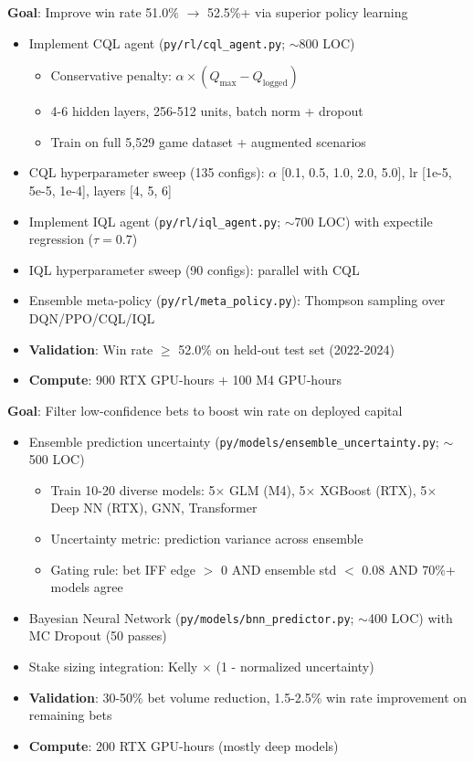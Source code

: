 \textbf{Goal}: Improve win rate 51.0\% $\to$ 52.5\%+ via superior policy learning

\begin{itemize}
  \item {} Implement CQL agent (\texttt{py/rl/cql\_agent.py}; $\sim$800 LOC)
  \begin{itemize}
    \item Conservative penalty: $\alpha \times (Q_{\max} - Q_{\text{logged}})$
    \item 4-6 hidden layers, 256-512 units, batch norm + dropout
    \item Train on full 5,529 game dataset + augmented scenarios
  \end{itemize}
  \item {} CQL hyperparameter sweep (135 configs): $\alpha$ [0.1, 0.5, 1.0, 2.0, 5.0], lr [1e-5, 5e-5, 1e-4], layers [4, 5, 6]
  \item {} Implement IQL agent (\texttt{py/rl/iql\_agent.py}; $\sim$700 LOC) with expectile regression ($\tau=0.7$)
  \item {} IQL hyperparameter sweep (90 configs): parallel with CQL
  \item {} Ensemble meta-policy (\texttt{py/rl/meta\_policy.py}): Thompson sampling over DQN/PPO/CQL/IQL
  \item {} \textbf{Validation}: Win rate $\ge$ 52.0\% on held-out test set (2022-2024)
  \item \textbf{Compute}: 900 RTX GPU-hours + 100 M4 GPU-hours
\end{itemize}

\textbf{Goal}: Filter low-confidence bets to boost win rate on deployed capital

\begin{itemize}
  \item {} Ensemble prediction uncertainty (\texttt{py/models/ensemble\_uncertainty.py}; $\sim$500 LOC)
  \begin{itemize}
    \item Train 10-20 diverse models: 5$\times$ GLM (M4), 5$\times$ XGBoost (RTX), 5$\times$ Deep NN (RTX), GNN, Transformer
    \item Uncertainty metric: prediction variance across ensemble
    \item Gating rule: bet IFF edge $>$ 0 AND ensemble std $<$ 0.08 AND 70\%+ models agree
  \end{itemize}
  \item {} Bayesian Neural Network (\texttt{py/models/bnn\_predictor.py}; $\sim$400 LOC) with MC Dropout (50 passes)
  \item {} Stake sizing integration: Kelly $\times$ (1 - normalized uncertainty)
  \item {} \textbf{Validation}: 30-50\% bet volume reduction, 1.5-2.5\% win rate improvement on remaining bets
  \item \textbf{Compute}: 200 RTX GPU-hours (mostly deep models)
\end{itemize}

